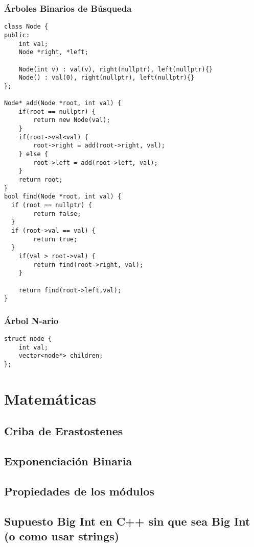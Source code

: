 \documentclass[11pt]{article}
\begin{document}
\subsubsection{Árboles Binarios de Búsqueda}
\label{sec:org65eed38}

\lstset{language=C++,label= ,caption= ,captionpos=b,numbers=none}
\begin{lstlisting}
class Node {
public:
	int val;
	Node *right, *left;

	Node(int v) : val(v), right(nullptr), left(nullptr){}
	Node() : val(0), right(nullptr), left(nullptr){}
};

Node* add(Node *root, int val) {
	if(root == nullptr) {
		return new Node(val);
	}
	if(root->val<val) {
		root->right = add(root->right, val);
	} else {
		root->left = add(root->left, val);
	}
	return root;
}
bool find(Node *root, int val) {
  if (root == nullptr) {
		return false;
  }
  if (root->val == val) {
		return true;
  }
	if(val > root->val) {
		return find(root->right, val);
	}

	return find(root->left,val);
}
\end{lstlisting}
\subsubsection{Árbol N-ario}
\label{sec:org6ddbaf2}
\lstset{language=C++,label= ,caption= ,captionpos=b,numbers=none}
\begin{lstlisting}
struct node {
	int val;
	vector<node*> children;
};
\end{lstlisting}

\section{Matemáticas}
\label{sec:orgbca84e3}

\subsection{Criba de Erastostenes}
\label{sec:org428ca0d}

\subsection{Exponenciación Binaria}
\label{sec:org0611e5c}

\subsection{Propiedades de los módulos}
\label{sec:org731f0cf}

\subsection{Supuesto Big Int en C++ sin que sea Big Int (o como usar strings)}
\label{sec:orga538b9f}
\end{document}
